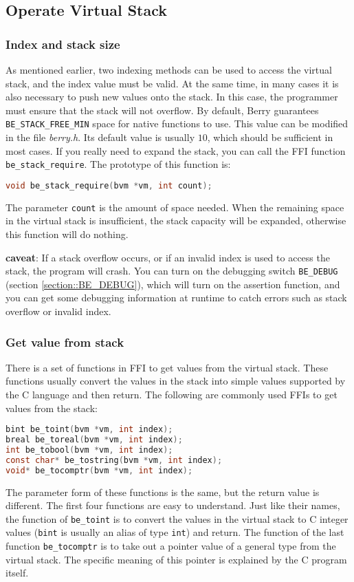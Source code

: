 \subsection {Operate Virtual Stack}

\subsubsection {Index and stack size}

As mentioned earlier, two indexing methods can be used to access the virtual stack, and the index value must be valid. At the same time, in many cases it is also necessary to push new values   onto the stack. In this case, the programmer must ensure that the stack will not overflow. By default, Berry guarantees \texttt{BE\_STACK\_FREE\_MIN} space for native functions to use. This value can be modified in the file \textsl{berry.h}. Its default value is usually $10$, which should be sufficient in most cases. If you really need to expand the stack, you can call the FFI function \texttt{be\_stack\_require}. The prototype of this function is:
\begin{lstlisting}[language=c, style=berry, numbers=none]
void be_stack_require(bvm *vm, int count);
\end{lstlisting}
The parameter \texttt{count} is the amount of space needed. When the remaining space in the virtual stack is insufficient, the stack capacity will be expanded, otherwise this function will do nothing.

\textbf{caveat}: If a stack overflow occurs, or if an invalid index is used to access the stack, the program will crash. You can turn on the debugging switch \texttt{BE\_DEBUG} (section \ref{section::BE_DEBUG}), which will turn on the assertion function, and you can get some debugging information at runtime to catch errors such as stack overflow or invalid index.

\subsubsection {Get value from stack}There is a set of functions in FFI to get values   from the virtual stack. These functions usually convert the values   in the stack into simple values   supported by the C language and then return. The following are commonly used FFIs to get values   from the stack:
\begin{lstlisting}[language=c, style=berry, numbers=none]
bint be_toint(bvm *vm, int index);
breal be_toreal(bvm *vm, int index);
int be_tobool(bvm *vm, int index);
const char* be_tostring(bvm *vm, int index);
void* be_tocomptr(bvm *vm, int index);
\end{lstlisting}
The parameter form of these functions is the same, but the return value is different. The first four functions are easy to understand. Just like their names, the function of \texttt{be\_toint} is to convert the values   in the virtual stack to C integer values   (\texttt{bint} is usually an alias of type \texttt{int}) and return. The function of the last function \texttt{be\_tocomptr} is to take out a pointer value of a general type from the virtual stack. The specific meaning of this pointer is explained by the C program itself.

